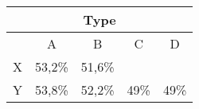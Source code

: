 \begin{table}
    \begin{tabular}{|l|c|c|c|c|}
    \hline
    \multicolumn{5}{|c|}{Type} \\
    \hline
      & A  &    B & C & D \\
        \hline
        X & 53,2\%  &   51,6\%  & \cellcolor[gray]{0.9}  & \cellcolor[gray]{0.9}\\
        Y  & 53,8\%  &  52,2\%  & \multirow{-2}{*}{\cellcolor[gray]{.9}49\%} & \multirow{-2}{*}{\cellcolor[gray]{0.9}49\% }\\
    \hline
    \end{tabular}
    \end{table}

    
